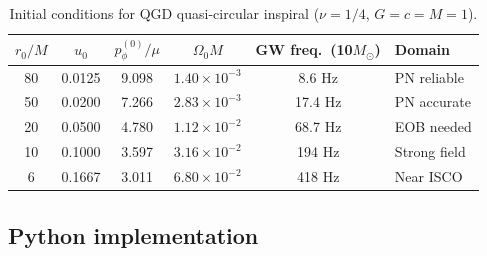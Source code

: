 \documentclass[11pt,a4paper]{article}
\theoremstyle{plain}
\theoremstyle{definition}
\theoremstyle{remark}
\begin{document}
\begin{table}[h]
\centering\small\renewcommand{\arraystretch}{1.3}
\caption{Initial conditions for QGD quasi-circular inspiral ($\nu=1/4$, $G=c=M=1$).}
\label{tab:IC}
\begin{tabular}{@{}cccccl@{}}
\toprule
$r_0/M$ & $u_0$ & $p_\phi^{(0)}/\mu$ & $\Omega_0 M$ & GW freq.\ (10$M_\odot$) & Domain \\
\midrule
80 & 0.0125 & 9.098 & $1.40\times10^{-3}$ & 8.6 Hz & PN reliable \\
50 & 0.0200 & 7.266 & $2.83\times10^{-3}$ & 17.4 Hz & PN accurate \\
20 & 0.0500 & 4.780 & $1.12\times10^{-2}$ & 68.7 Hz & EOB needed \\
10 & 0.1000 & 3.597 & $3.16\times10^{-2}$ & 194 Hz & Strong field \\
6  & 0.1667 & 3.011 & $6.80\times10^{-2}$ & 418 Hz & Near ISCO \\
\bottomrule
\end{tabular}
\end{table}

\subsection{Python implementation}
\end{document}
